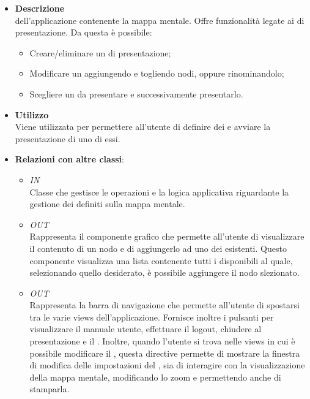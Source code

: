\FloatBarrier
\begin{itemize}
\item \textbf{Descrizione}\\
 dell’applicazione contenente la mappa mentale. Offre funzionalità legate ai  di presentazione.
Da questa  è possibile:
\begin{itemize}
\item Creare/eliminare un  di presentazione;
\item Modificare un  aggiungendo e togliendo nodi, oppure rinominandolo;
\item Scegliere un  da presentare e successivamente presentarlo.
\end{itemize}
\item \textbf{Utilizzo}\\
Viene utilizzata per permettere all’utente di definire dei  e avviare la presentazione di uno di essi.
\item \textbf{Relazioni con altre classi}:
\begin{itemize}
\item \textit{IN} \hyperref[\nogloxy{Premi::Front-End::Controllers::PathsEditorController}]{}\\
Classe che gestisce le operazioni e la logica applicativa riguardante la gestione dei  definiti sulla mappa mentale.
\item \textit{OUT} \hyperref[\nogloxy{Premi::Front-End::Directives::premiAddToPath}]{}\\
Rappresenta il componente grafico che permette all’utente di visualizzare il contenuto di un nodo e di aggiungerlo ad uno dei  esistenti.
Questo componente visualizza una lista contenente tutti i  disponibili al quale, selezionando quello desiderato, è possibile aggiungere il nodo slezionato.
\item \textit{OUT} \hyperref[\nogloxy{Premi::Front-End::Directives::premiHeader}]{}\\
Rappresenta la barra di navigazione che permette all’utente di spostarsi tra le varie views dell'applicazione. Fornisce inoltre i pulsanti per visualizzare il manuale utente, effettuare il logout, chiudere al presentazione e il . Inoltre, quando l'utente si trova nelle views in cui è possibile modificare il , questa directive permette di mostrare la finestra di modifica delle impostazioni del , sia di interagire con la visualizzazione della mappa mentale, modificando lo zoom e permettendo anche di stamparla.

\end{itemize}
\end{itemize}
